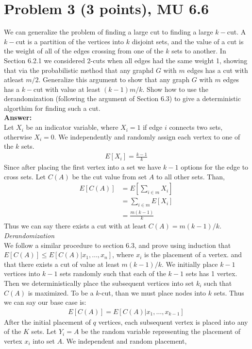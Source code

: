 \documentclass[letterpaper, 11pt]{article}
\begin{document}
\section*{Problem 3 (3 points), MU 6.6}
We can generalize the problem of finding a large cut to finding a large $k-$cut. A $k-$cut is a partition of the vertices into $k$ disjoint sets, and the value of a cut is the weight of all of the edges crossing from one of the $k$ sets to another. In Section 6.2.1 we considered 2-cuts when all edges had the same weight 1, showing that via the probabilistic method that any graphd $G$ with $m$ edges has a cut with atleast $m/2$. Generalize this argument to show that any graph $G$ with $m$ edges has a $k-$cut with value at least $(k-1)m/k$. Show how to use the derandomization (following the argument of Section 6.3) to give a deterministic algorthim for finding such a cut. \\
\textbf{Answer:} \\
Let $X_i$ be an indicator variable, where $X_i = 1$ if edge $i$ connects two sets, otherwise $X_i = 0$. We independently and randomly assign each vertex to one of the $k$ sets.
\begin{align}
E[X_i] = \frac{k-1}{k}
\end{align}
Since after placing the first vertex into a set we have $k-1$ options for the edge to cross sets. Let $C(A)$ be the cut value from set $A$ to all other sets. Than,
\begin{align}
E[C(A)] &= E\left[\sum_{i \in m} X_i\right] \\
&= \sum_{i \in m} E[X_i] \\
&= \frac{m(k-1)}{k}
\end{align}
Thus we can say there exists a cut with at least $C(A) = m(k-1)/k$.\\
\emph{Derandomization}\\
We follow a similar procedure to section 6.3, and prove using induction that $E[C(A)] \leq E[C(A)|x_1,\dots,x_n]$, where $x_i$ is the placement of a vertex. and that there exists a cut of value at least $m(k-1)/k$.
We initially place $k-1$ vertices into $k-1$ sets randomly such that each of the $k-1$ sets has 1 vertex. Then we deterministically place the subsequent vertices into set $k_i$ such that $C(A)$ is maximized.
To be a $k$-cut, than we must place nodes into $k$ sets. Thus we can say our base case is:
\begin{align}
E[C(A)] = E[C(A)|x_1,\dots,x_{k-1}]
\end{align}
After the initial placement of $q$ vertices, each subsequent vertex is placed into any of the $K$ sets. Let $Y_i = A$ be the random variable representing the placement of vertex $x_i$ into set $A$. We independent and random placement,
\end{document}
